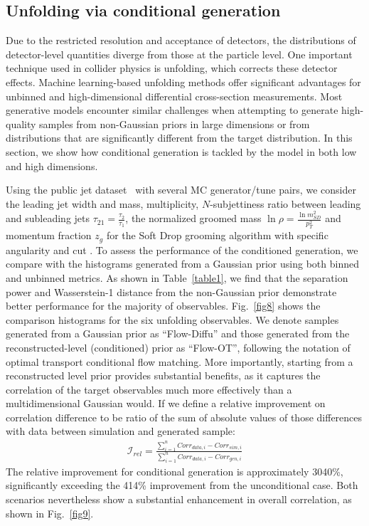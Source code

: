 \documentclass[%
 reprint,
 amsmath,amssymb,
 aps,
prd,
floatfix,
]{revtex4-2}
\begin{document}
\subsection{Unfolding via conditional generation}\label{subsec4.3}

Due to the restricted resolution and acceptance of detectors, the distributions of detector-level quantities diverge from those at the particle level. One important technique used in collider physics is unfolding, which corrects these detector effects. Machine learning-based unfolding methods \cite{cinnfold,sbfold,omnifold} offer significant advantages for unbinned and high-dimensional differential cross-section measurements. Most generative models encounter similar challenges when attempting to generate high-quality samples from non-Gaussian priors in large dimensions or from distributions that are significantly different from the target distribution. In this section, we show how conditional generation is tackled by the model in both low and high dimensions.

Using the public jet dataset~\cite{omnifold,omnifold_zenodo} with several MC generator/tune pairs, we consider the leading jet width and mass, multiplicity, $N$-subjettiness ratio between leading and subleading jets $\tau_{21} = \frac{\tau_2}{\tau_1}$, the normalized groomed mass $\ln\rho = \frac{\ln m_{SD}^2}{p_T^2}$ and momentum fraction $z_g$ for the Soft Drop grooming algorithm with specific angularity and cut \cite{softdrop0,softdrop1}. To assess the performance of the conditioned generation, we compare with the histograms generated from a Gaussian prior using both binned and unbinned metrics. As shown in Table~\ref{table1}, we find that the separation power and Wasserstein-1 distance from the non-Gaussian prior demonstrate better performance for the majority of observables. Fig.~\ref{fig8} shows the comparison histograms for the six unfolding observables. We denote samples generated from a Gaussian prior as ``Flow-Diffu'' and those generated from the reconstructed-level (conditioned) prior as ``Flow-OT'', following the notation of optimal transport conditional flow matching. More importantly, starting from a reconstructed level prior provides substantial benefits, as it captures the correlation of the target observables much more effectively than a multidimensional Gaussian would. If we define a relative improvement on correlation difference to be ratio of the sum of absolute values of those differences with data between simulation and generated sample:
\begin{gather}
    \mathcal{I}_{rel} = \frac{\sum_{i=1}^n Corr_{data,i}-Corr_{sim,i}}{\sum_{i=1}^n Corr_{data,i}-Corr_{gen,i}}
\end{gather}
The relative improvement for conditional generation is approximately 3040\%, significantly exceeding the 414\% improvement from the unconditional case. Both scenarios nevertheless show a substantial enhancement in overall correlation, as shown in Fig.~\ref{fig9}.
\end{document}
